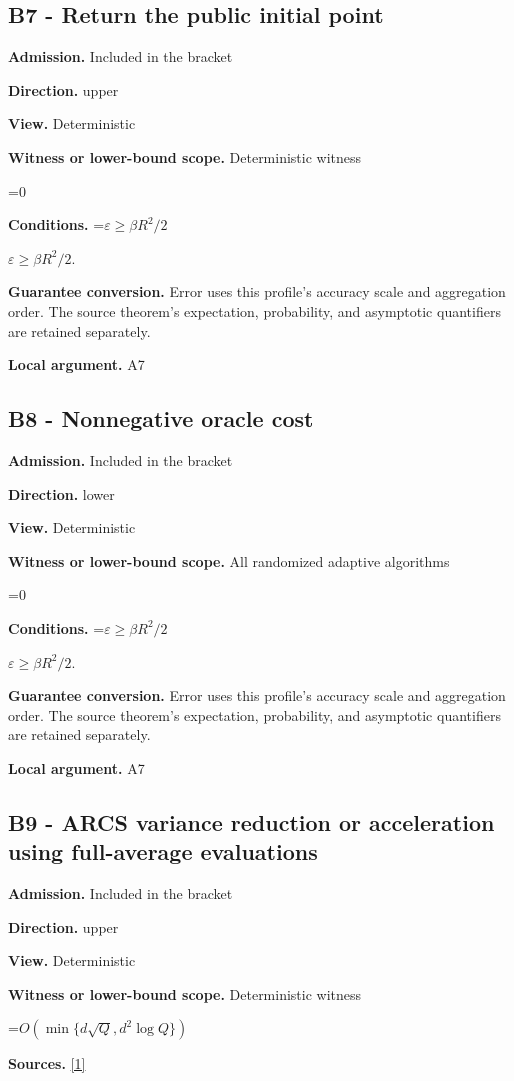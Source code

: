 \documentclass[10pt,a4paper]{article}
\newcommand{\AtlasMath}[1]{\par\begingroup\centering\setbox0=\hbox{$\displaystyle #1$}\ifdim\wd0>1.4\linewidth\typeout{ATLAS WIDE FORMULA: \the\wd0}\fi\ifdim\wd0>\linewidth\resizebox{\linewidth}{!}{\box0}\else\box0\fi\par\endgroup}
\newcommand{\AtlasInlineMath}[1]{\begingroup\setbox0=\hbox{$#1$}\ifdim\wd0>.4\linewidth\endgroup\AtlasMath{#1}\else\endgroup$#1$\fi}
\begin{document}
\subsection{B7 - Return the public initial point}
\textbf{Admission.} Included in the bracket

\textbf{Direction.} upper

\textbf{View.} Deterministic

\textbf{Witness or lower-bound scope.} Deterministic witness

\AtlasMath{0}
\textbf{Conditions.} \AtlasInlineMath{\varepsilon\ge\beta R^2/2}.

\textbf{Guarantee conversion.} Error uses this profile's accuracy scale and aggregation order. The source theorem's expectation, probability, and asymptotic quantifiers are retained separately.

\textbf{Local argument.} A7

\subsection{B8 - Nonnegative oracle cost}
\textbf{Admission.} Included in the bracket

\textbf{Direction.} lower

\textbf{View.} Deterministic

\textbf{Witness or lower-bound scope.} All randomized adaptive algorithms

\AtlasMath{0}
\textbf{Conditions.} \AtlasInlineMath{\varepsilon\ge\beta R^2/2}.

\textbf{Guarantee conversion.} Error uses this profile's accuracy scale and aggregation order. The source theorem's expectation, probability, and asymptotic quantifiers are retained separately.

\textbf{Local argument.} A7

\subsection{B9 - ARCS variance reduction or acceleration using full-average evaluations}
\textbf{Admission.} Included in the bracket

\textbf{Direction.} upper

\textbf{View.} Deterministic

\textbf{Witness or lower-bound scope.} Deterministic witness

\AtlasMath{O\!\left(\min\{d\sqrt Q,d^2\log Q\}\right)}
\textbf{Sources.} \href{https://arxiv.org/html/2610.00345v1}{[1]}
\end{document}
